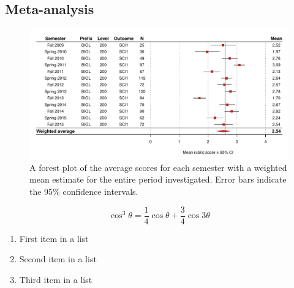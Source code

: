 \documentclass[fleqn,10pt]{SelfArx}\usepackage[]{graphicx}\usepackage[]{color}
\begin{document}
\lipsum[1]
\subsection{Meta-analysis}
\begin{figure}[htb]\centering %

\includegraphics[width=\textwidth]{./figure/forest}
\protect\caption{A forest plot of the average scores for each semester with a weighted mean estimate for the entire period investigated. Error bars indicate the 95\% confidence intervals.}
\label{fig:forest.pdf}
\end{figure}

\lipsum[1] %
\lipsum[1]

\begin{equation}
\cos^3 \theta =\frac{1}{4}\cos\theta+\frac{3}{4}\cos 3\theta
\label{eq:refname2}
\end{equation}

\lipsum[1] %

\begin{enumerate}[noitemsep] %
\item First item in a list
\item Second item in a list
\item Third item in a list
\end{enumerate}
\end{document}
